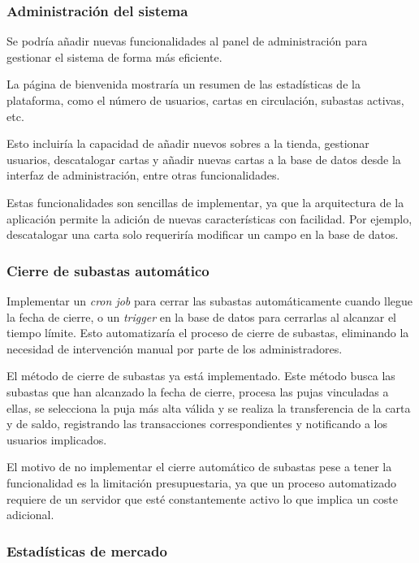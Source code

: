     \subsubsection{Administración del sistema}
    Se podría añadir nuevas funcionalidades al panel de administración para gestionar el sistema de forma más eficiente.

    La página de bienvenida mostraría un resumen de las estadísticas de la plataforma, como el número de usuarios, cartas en circulación, subastas activas, etc.


    Esto incluiría la capacidad de añadir nuevos sobres a la tienda, gestionar usuarios, descatalogar cartas y añadir nuevas cartas a la base de datos desde la interfaz de administración, 
    entre otras funcionalidades.

    Estas funcionalidades son sencillas de implementar, ya que la arquitectura de la aplicación permite la adición de nuevas características con facilidad. 
    Por ejemplo, descatalogar una carta solo requeriría modificar un campo en la base de datos.


    \subsubsection{Cierre de subastas automático}
    Implementar un \textit{cron job} para cerrar las subastas automáticamente cuando llegue la fecha de cierre, o un \textit{trigger} en la base de datos 
    para cerrarlas al alcanzar el tiempo límite. Esto automatizaría el proceso de cierre de subastas, eliminando la necesidad de intervención manual por parte de los administradores. 

    El método de cierre de subastas ya está implementado. Este método busca las subastas que han alcanzado la fecha de cierre, procesa las pujas vinculadas a ellas,
    se selecciona la puja más alta válida y se realiza la transferencia de la carta y de saldo, registrando las transacciones correspondientes y notificando a los usuarios implicados.
    
    El motivo de no implementar el cierre automático de subastas pese a tener la funcionalidad es la limitación presupuestaria, 
    ya que un proceso automatizado requiere de un servidor que esté constantemente activo lo que implica un coste adicional.

    \subsubsection{Estadísticas de mercado}

